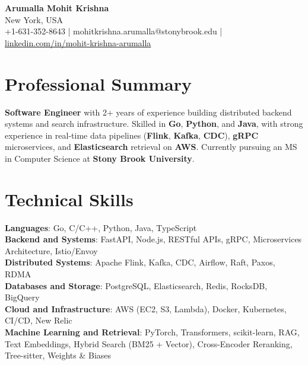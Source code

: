 \documentclass[letterpaper,11pt]{article}
\begin{document}
\begin{center}
  {\Large \textbf{Arumalla Mohit Krishna}} \\
  New York, USA \\
  +1-631-352-8643 \enspace | \enspace mohitkrishna.arumalla@stonybrook.edu \enspace | \enspace \href{https://www.linkedin.com/in/mohit-krishna-arumalla}{linkedin.com/in/mohit-krishna-arumalla}
\end{center}

\section{Professional Summary}
  \begin{itemize}[leftmargin=0.15in, label={}]
    \small{\item{
     \textbf{Software Engineer} with 2+ years of experience building distributed backend systems and search infrastructure. Skilled in \textbf{Go}, \textbf{Python}, and \textbf{Java}, with strong experience in real-time data pipelines (\textbf{Flink}, \textbf{Kafka}, \textbf{CDC}), \textbf{gRPC} microservices, and \textbf{Elasticsearch} retrieval on \textbf{AWS}. Currently pursuing an MS in Computer Science at \textbf{Stony Brook University}.
    }}
  \end{itemize}
\vspace{-16pt}

\section{Technical Skills}
 \begin{itemize}[leftmargin=0.15in, label={}]
    \small{\item{
     \textbf{Languages}: Go, C/C++, Python, Java, TypeScript \\
     \textbf{Backend and Systems}: FastAPI, Node.js, RESTful APIs, gRPC, Microservices Architecture, Istio/Envoy \\
     \textbf{Distributed Systems}: Apache Flink, Kafka, CDC, Airflow, Raft, Paxos, RDMA \\
     \textbf{Databases and Storage}: PostgreSQL, Elasticsearch, Redis, RocksDB, BigQuery \\
     \textbf{Cloud and Infrastructure}: AWS (EC2, S3, Lambda), Docker, Kubernetes, CI/CD, New Relic \\
     \textbf{Machine Learning and Retrieval}: PyTorch, Transformers, scikit-learn, RAG, Text Embeddings, Hybrid Search (BM25 + Vector), Cross-Encoder Reranking, Tree-sitter, Weights \& Biases
    }}
 \end{itemize}
\vspace{-16pt}
\end{document}
